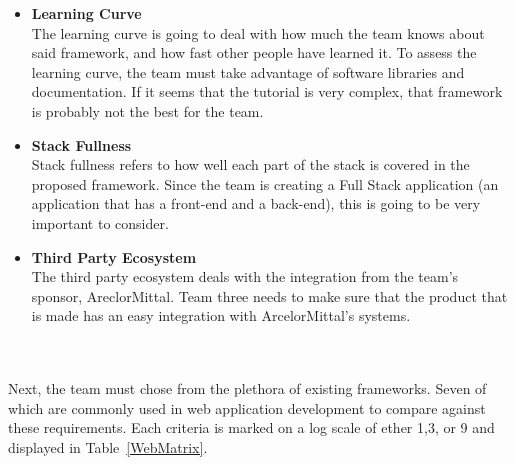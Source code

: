 \documentclass[Letter,11pt]{article}
\begin{document}
		\begin{minipage}[t]{0.5\textwidth}
		\begin{itemize}
			\item \textbf{Learning Curve} \\
			The learning curve is going to deal with how much the team knows about said framework, and how fast other people have learned it. To assess the learning curve, the team must take advantage of software libraries and documentation. If it seems that the tutorial is very complex, that framework is probably not the best for the team. 


			\item \textbf{Stack Fullness} \\
			Stack fullness refers to how well each part of the stack is covered in the proposed framework. Since the team is creating a Full Stack application (an application that has a front-end and a back-end), this is going to be very important to consider.

			\item \textbf{Third Party Ecosystem}\\
			The third party ecosystem deals with the integration from the team's sponsor, AreclorMittal. Team three needs to make sure that the product that is made has an easy integration with ArcelorMittal's systems. 
			
		\end{itemize}
		\end{minipage}\\
		\\

		Next, the team must chose from the plethora of existing frameworks. Seven of which are commonly used in web application development to compare against these requirements. Each criteria is marked on a log scale of ether 1,3, or 9 and displayed in Table~\ref{WebMatrix}.
		
\end{document}
